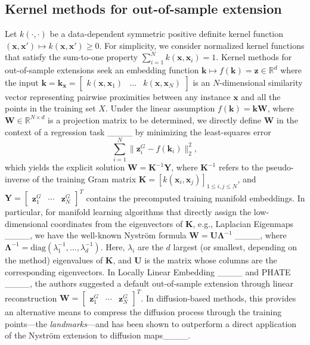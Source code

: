 \subsection{Kernel methods for out-of-sample extension}\label{subsec:kernel_methods}
Let $k(\cdot, \cdot)$ be a data-dependent symmetric positive definite kernel function $(\mathbf{x}, \mathbf{x}')\mapsto k(\mathbf{x}, \mathbf{x}')\geq 0$. For simplicity, we consider normalized kernel functions that satisfy the sum-to-one property $\sum_{i=1}^N k(\mathbf{x}, \mathbf{x}_i)=1$. Kernel methods for out-of-sample extensions seek an embedding function $\mathbf{k}\mapsto f(\mathbf{k})=\mathbf{z}\in \mathbb{R}^d$ where the input
$
    \mathbf{k} =  \mathbf{k}_{\mathbf{x}} = \begin{bmatrix}
     k(\mathbf{x}, \mathbf{x}_1)  & \hdots &     
     k(\mathbf{x}, \mathbf{x}_N)
\end{bmatrix}
$
is an $N$-dimensional similarity vector representing pairwise proximities between any instance $\mathbf{x}$ and all the points in the training set $X$. Under the linear assumption \(f(\mathbf{k}) = \mathbf{k}\mathbf{W}\), where \(\mathbf{W} \in \mathbb{R}^{N \times d}\) is a projection matrix to be determined, we directly define \(\mathbf{W}\) in the context of a regression task ____ by minimizing the least-squares error
\begin{equation}\label{eq:least-squares}
    \sum_{i=1}^N \|\mathbf{z}_i^G - f(\mathbf{k}_i)\|_2^2,
\end{equation}
which yields the explicit solution
$\mathbf{W} = \mathbf{K}^{-1}\mathbf{Y}$,
where \(\mathbf{K}^{-1}\) refers to the pseudo-inverse of the training Gram matrix $\mathbf{K}=[k(\mathbf{x}_i, \mathbf{x}_j)]_{1\leq i,j \leq N}$, and \(\mathbf{Y} = \begin{bmatrix}
    \mathbf{z}_1^G & \cdots & \mathbf{z}_N^G
\end{bmatrix}^T\) contains the precomputed training manifold embeddings. In particular, for manifold learning algorithms that directly assign the low-dimensional coordinates from the eigenvectors of $\mathbf{K}$, e.g., Laplacian Eigenmaps ____, we have the well-known Nyström formula \(\mathbf{W} = \mathbf{U}\mathbf{\Lambda}^{-1}\) ____, where \(\mathbf{\Lambda}^{-1} = \text{diag}\left(  \lambda_1^{-1}, \hdots, \lambda_d^{-1} \right)\). Here, \(\lambda_i\) are the $d$ largest (or smallest, depending on the method) eigenvalues of $\mathbf{K}$, and \(\mathbf{U}\) is the matrix whose columns are the corresponding eigenvectors. In Locally Linear Embedding ____ and PHATE ____, the authors suggested a default out-of-sample extension through linear reconstruction $\mathbf{W}=\begin{bmatrix}
    \mathbf{z}_1^G & \cdots & \mathbf{z}_N^G
\end{bmatrix}^T$. In diffusion-based methods, this provides an alternative means to compress the diffusion process through the training points---the \textit{landmarks}---and has been shown to outperform a direct application of the Nyström extension to diffusion maps____.

